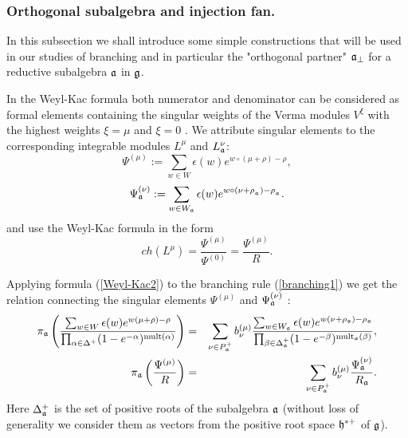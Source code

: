\subsubsection{Orthogonal subalgebra and injection fan.}
\label{subsec:branching-orthog-pair}

In this subsection we shall introduce some simple constructions that will be used
in our studies of branching and in particular the "orthogonal partner" $\mathfrak{a}_{\bot}$ for a
reductive subalgebra $\mathfrak{a}$  in  $\mathfrak{g}$.

In the Weyl-Kac formula both numerator and denominator  can be considered
as formal elements containing the singular weights of the Verma modules $V^{\xi}$
with the highest weights $\xi=\mu$ and $\xi=0$ \cite{humphreys1997introduction}.
We attribute singular elements to the corresponding integrable modules $L^{\mu }$
and $L_{\mathfrak{a}}^{\nu }$:
\begin{equation*}
\Psi ^{\left( \mu \right) }:=\sum\limits_{w\in W}\epsilon (w)e^{w\circ (\mu +\rho )-\rho },
\end{equation*}
\begin{equation*}
\Psi _{ \mathfrak{a}}^{\left( \nu \right) }:=
\sum\limits_{w\in W_{\mathfrak{a}}}\epsilon (w)e^{w\circ (\nu +\rho
_{_{\mathfrak{a}}})-\rho _{_{\mathfrak{a}}}}.
\end{equation*}
and use the Weyl-Kac formula in the form
\begin{equation}
\label{Weyl-Kac2}
ch\left( L^{\mu }\right) =\frac{\Psi ^{\left( \mu \right) }}
{\Psi ^{\left( 0 \right) }}=\frac{\Psi ^{\left( \mu \right) }}{R}.
\end{equation}

Applying formula (\ref{Weyl-Kac2}) to the branching rule (\ref{branching1})
we get the relation connecting the
singular elements $\Psi ^{\left( \mu \right) }$ and $\Psi _{ \mathfrak{a}}^{\left( \nu \right) }$ :
\begin{eqnarray}
\nonumber
\pi _{\af}\left( \frac{\sum_{w \in W}\epsilon (w )e^{w
(\mu +\rho )-\rho }}{\prod_{\alpha \in \Delta ^{+}}(1-e^{-\alpha })^{\mathrm{%
mult}(\alpha )}}\right) &=&\sum_{\nu \in P_{\af}^{+}}b_{\nu }^{(\mu )}%
\frac{\sum_{w \in W_{\af}}\epsilon (w )e^{w (\nu +\rho _{%
\af})-\rho _{\af}}}{\prod_{\beta \in \Delta _{\af%
}^{+}}(1-e^{-\beta })^{\mathrm{mult}_{\af}(\beta )}},  \label{eq:4} \\
\pi _{\af}\left( \frac{\Psi ^{\left( \mu \right) }}{R}\right)
&=&\sum_{\nu \in P_{\af}^{+}}b_{\nu }^{(\mu )}\frac{\Psi _{ \frak{%
a}}^{\left( \nu \right) }}{R_{\af}}.
\end{eqnarray}
Here $\Delta _{\mathfrak{a}}^{+}$ is the set of
positive roots of the subalgebra $\mathfrak{a}$ (without loss of generality we consider
them as vectors from the positive root space $\frak{h}^{\ast  +}$ of $\frak{g}$).



